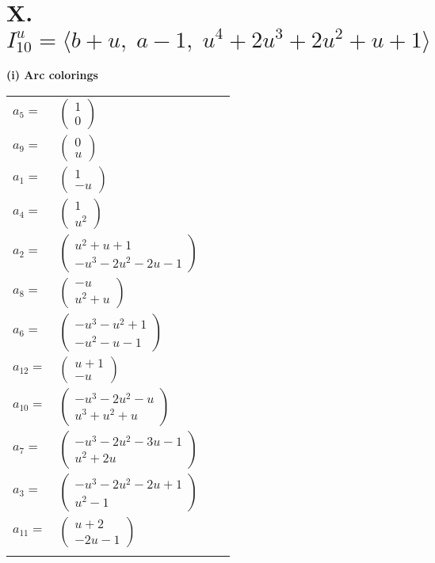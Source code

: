 \documentclass[1p]{elsarticle_modified}
\theoremstyle{definition}
\begin{document}
\centering \section*{X. $I^u_{10}= \langle b+u,\;a-1,\;u^4+2 u^3+2 u^2+u+1 \rangle$}
\flushleft \textbf{(i) Arc colorings}\\
\begin{tabular}{m{7pt} m{180pt} m{7pt} m{180pt} }
\flushright $a_{5}=$&$\begin{pmatrix}1\\0\end{pmatrix}$ \\
\flushright $a_{9}=$&$\begin{pmatrix}0\\u\end{pmatrix}$ \\
\flushright $a_{1}=$&$\begin{pmatrix}1\\- u\end{pmatrix}$ \\
\flushright $a_{4}=$&$\begin{pmatrix}1\\u^2\end{pmatrix}$ \\
\flushright $a_{2}=$&$\begin{pmatrix}u^2+u+1\\- u^3-2 u^2-2 u-1\end{pmatrix}$ \\
\flushright $a_{8}=$&$\begin{pmatrix}- u\\u^2+u\end{pmatrix}$ \\
\flushright $a_{6}=$&$\begin{pmatrix}- u^3- u^2+1\\- u^2- u-1\end{pmatrix}$ \\
\flushright $a_{12}=$&$\begin{pmatrix}u+1\\- u\end{pmatrix}$ \\
\flushright $a_{10}=$&$\begin{pmatrix}- u^3-2 u^2- u\\u^3+u^2+u\end{pmatrix}$ \\
\flushright $a_{7}=$&$\begin{pmatrix}- u^3-2 u^2-3 u-1\\u^2+2 u\end{pmatrix}$ \\
\flushright $a_{3}=$&$\begin{pmatrix}- u^3-2 u^2-2 u+1\\u^2-1\end{pmatrix}$ \\
\flushright $a_{11}=$&$\begin{pmatrix}u+2\\-2 u-1\end{pmatrix}$\\&\end{tabular}
\end{document}
